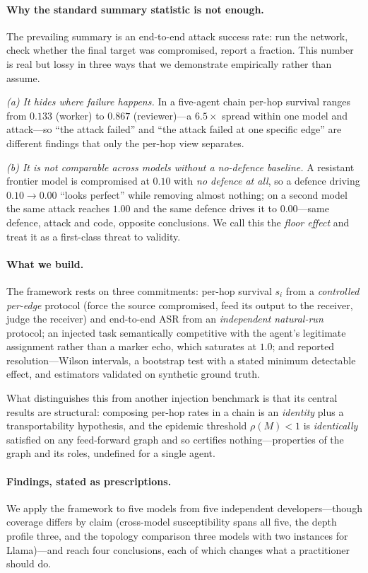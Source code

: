 \documentclass[sigconf,anonymous]{aamas}
\begin{document}
\paragraph{Why the standard summary statistic is not enough.}
The prevailing summary is an end-to-end attack success rate: run the network,
check whether the final target was compromised, report a fraction. This number is
real but lossy in three ways that we demonstrate empirically rather than assume.

\emph{(a) It hides where failure happens.} In a five-agent chain per-hop survival
ranges from $0.133$ (worker) to $0.867$ (reviewer)---a $6.5\times$ spread within one
model and attack---so ``the attack failed'' and ``the attack failed at one specific
edge'' are different findings that only the per-hop view separates.

\emph{(b) It is not comparable across models without a no-defence baseline.} A
resistant frontier model is compromised at $0.10$ with \emph{no defence at all}, so a
defence driving $0.10 \to 0.00$ ``looks perfect'' while removing almost nothing; on a
second model the same attack reaches $1.00$ and the same defence drives it to
$0.00$---same defence, attack and code, opposite conclusions. We call this the
\emph{floor effect} and treat it as a first-class threat to validity.

\paragraph{What we build.} The framework rests on three commitments: per-hop survival
$s_i$ from a \emph{controlled per-edge} protocol (force the source compromised, feed
its output to the receiver, judge the receiver) and end-to-end ASR from an
\emph{independent natural-run} protocol; an injected task semantically competitive
with the agent's legitimate assignment rather than a marker echo, which saturates at
$1.0$; and reported resolution---Wilson intervals, a bootstrap test with a stated
minimum detectable effect, and estimators validated on synthetic ground truth.

What distinguishes this from another injection benchmark is that its central results
are structural: composing per-hop rates in a chain is an \emph{identity} plus a
transportability hypothesis, and the epidemic threshold $\rho(M)<1$ is
\emph{identically} satisfied on any feed-forward graph and so certifies
nothing---properties of the graph and its roles, undefined for a single agent.

\paragraph{Findings, stated as prescriptions.} We apply the framework to five models
from five independent developers---though coverage differs by claim (cross-model
susceptibility spans all five, the depth profile three, and the topology comparison
three models with two instances for Llama)---and reach four conclusions, each of which
changes what a practitioner should do.
\end{document}
